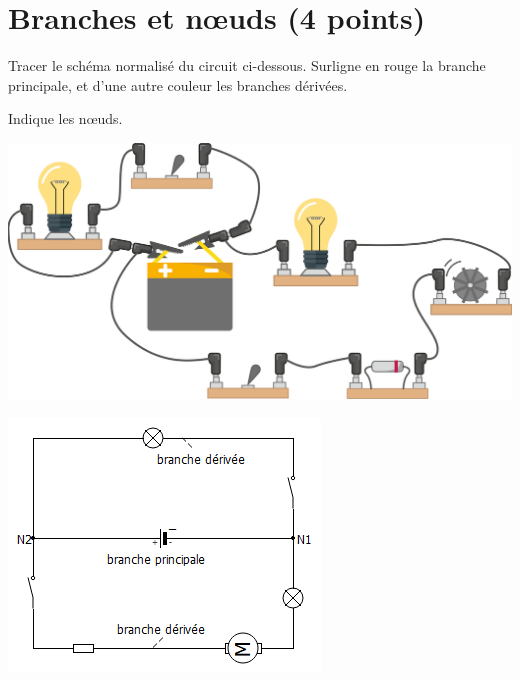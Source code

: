 \section{Branches et n\oe uds (4 points)}

\begin{questions}
	\question Tracer le schéma normalisé du circuit ci-dessous.
	\question Surligne en rouge la branche principale, et d'une autre couleur les branches dérivées.
	
	\question Indique les n\oe uds.
\end{questions}

\begin{center}
	\includegraphics[scale=0.3]{img/ex18}
\end{center}

\begin{solution}
	\begin{center}
		\includegraphics[scale=1.1]{img/ex3_exam}
	\end{center}
\end{solution}